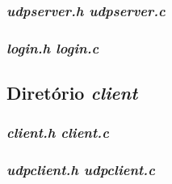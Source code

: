 \documentclass[a4paper,10pt]{article}
\begin{document}
\subsubsection{\label{itm:udpserver.c}\emph{udpserver.h udpserver.c}}


\subsubsection{\label{itm:login.c}\emph{login.h login.c}}


\subsection{Diretório \textit{client}}
\subsubsection{\label{itm:client.c}\emph{client.h client.c}}


\subsubsection{\label{itm:udpclient.c}\emph{udpclient.h udpclient.c}}


\end{document}
